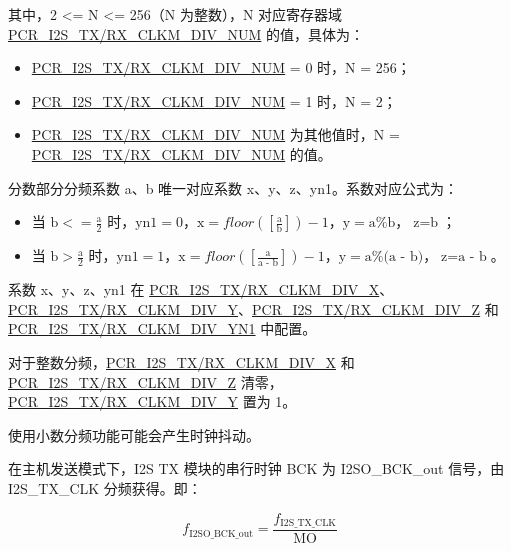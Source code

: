 \documentclass[main\_\_CN.tex]{subfiles}
\begin{document}
其中，2 <= N <= 256（N 为整数），N 对应寄存器域 \hyperref[fielddesc:PCRI2STXCLKMDIVNUM]{PCR\_I2S\_TX/RX\_CLKM\_DIV\_NUM} 的值，具体为：

\begin{itemize}
    \item \hyperref[fielddesc:PCRI2STXCLKMDIVNUM]{PCR\_I2S\_TX/RX\_CLKM\_DIV\_NUM} = 0 时，N = 256；
    \item \hyperref[fielddesc:PCRI2STXCLKMDIVNUM]{PCR\_I2S\_TX/RX\_CLKM\_DIV\_NUM} = 1 时，N = 2；
    \item \hyperref[fielddesc:PCRI2STXCLKMDIVNUM]{PCR\_I2S\_TX/RX\_CLKM\_DIV\_NUM} 为其他值时，N = \hyperref[fielddesc:PCRI2STXCLKMDIVNUM]{PCR\_I2S\_TX/RX\_CLKM\_DIV\_NUM} 的值。
\end{itemize}

分数部分分频系数 a、b 唯一对应系数 x、y、z、yn1。系数对应公式为：

\begin{itemize}
    \item 当 $\textrm{b} <= \frac{\textrm{a}}{2}$ 时，$\textrm{yn1} = 0$，$\textrm{x} = floor([\frac{\textrm{a}}{\textrm{b}}]) - 1$，$\textrm{y} = \textrm{a}\%\textrm{b}$，$\textrm{z} = \textrm{b}$；
    \item 当 $\textrm{b} > \frac{\textrm{a}}{2}$ 时，$\textrm{yn1}=1$，$\textrm{x} = floor([\frac{\textrm{a}}{\textrm{a - b}}]) - 1$，$\textrm{y} = \textrm{a}\%\textrm{(a - b)}$，$\textrm{z}=\textrm{a - b}$。
\end{itemize}

系数 x、y、z、yn1 在  \hyperref[fielddesc:PCRI2STXCLKMDIVX]{PCR\_I2S\_TX/RX\_CLKM\_DIV\_X}、\hyperref[fielddesc:PCRI2STXCLKMDIVY]{PCR\_I2S\_TX/RX\_CLKM\_DIV\_Y}、\hyperref[fielddesc:PCRI2STXCLKMDIVZ]{PCR\_I2S\_TX/RX\_CLKM\_DIV\_Z} 和 \hyperref[fielddesc:PCRI2STXCLKMDIVYN1]{PCR\_I2S\_TX/RX\_CLKM\_DIV\_YN1} 中配置。 

对于整数分频，\hyperref[fielddesc:PCRI2STXCLKMDIVX]{PCR\_I2S\_TX/RX\_CLKM\_DIV\_X} 和 \hyperref[fielddesc:PCRI2STXCLKMDIVZ]{PCR\_I2S\_TX/RX\_CLKM\_DIV\_Z} 清零，\hyperref[fielddesc:PCRI2STXCLKMDIVY]{PCR\_I2S\_TX/RX\_CLKM\_DIV\_Y} 置为 1。

\begin{tiplisting}
使用小数分频功能可能会产生时钟抖动。
\end{tiplisting}

在主机发送模式下，I2S TX 模块的串行时钟 BCK 为 I2SO\_BCK\_out 信号，由 I2S\_TX\_CLK 分频获得。即：

$$f_{\textrm{I2SO\_BCK\_out}} = \frac{f_{\textrm{I2S\_TX\_CLK}}}{\textrm{MO}}$$
\end{document}
